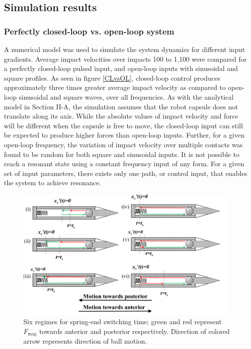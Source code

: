 \documentclass[letterpaper, 10 pt, conference]{ieeeconf}  %
\begin{document}
\subsection{Simulation results}

\subsubsection{Perfectly closed-loop vs. open-loop system}
\label{clol}

A numerical model was used to simulate the system dynamics for different input gradients. Average impact velocities over impacts 100 to 1,100 were compared for a perfectly closed-loop pulsed input, and open-loop inputs with sinusoidal and square profiles. As seen in figure \ref{CLvsOL}, closed-loop control produces approximately three times greater average impact velocity as compared to open-loop sinusoidal and square waves, over all frequencies. As with the analytical model in Section II-A, the simulation assumes that the robot capsule does not translate along its axis. While the absolute values of impact velocity and force will be different when the capsule is free to move, the closed-loop input can still be expected to produce higher forces than open-loop inputs. Further, for a given open-loop frequency, the variation of impact velocity over multiple contacts was found to be random for both square and sinusoidal inputs. It is not possible to reach a resonant state using a constant frequency input of any form. For a given set of input parameters, there exists only one path, or control input, that enables the system to achieve resonance. 
\begin{figure}
	\includegraphics[width=\linewidth]{Tswitchcases.pdf}
	\caption{Six regimes for spring-end switching time; green and red represent $F_{\textrm{mag}}$ towards anterior and posterior respectively. Direction of colored arrow represents direction of ball motion.}
	\label{Tswitch}
	\vspace{-2em}
\end{figure}
\end{document}
